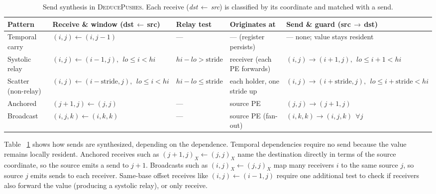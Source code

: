 \documentclass[sigplan, nonacm]{acmart}
\begin{document}
\begin{table}[t]
\centering
\caption{Send synthesis in \textsc{DeducePushes}. Each receive
(\emph{dst}\,$\leftarrow$\,\emph{src}) is classified by its coordinate
and matched with a send.} %
\label{tab:send-taxonomy}
\small
\renewcommand{\arraystretch}{1.35}
\begin{tabular}{@{}lllll@{}}
\toprule
\textbf{Pattern} & \textbf{Receive \& window (dst\,$\leftarrow$\,src)} &
\textbf{Relay test} & \textbf{Originates at} &
\textbf{Send \& guard (src\,$\rightarrow$\,dst)} \\
\midrule
Temporal carry & $(i,j)\leftarrow(i,j{-}1)$ & --- & --- (register persists) & --- none; value stays resident \\
Systolic relay & $(i,j)\leftarrow(i{-}1,j),\ \ \mathit{lo}\le i<\mathit{hi}$ & $\mathit{hi}{-}\mathit{lo}>\text{stride}$ & receiver (each PE forwards) & $(i,j)\rightarrow(i{+}1,j),\ \ \mathit{lo}\le i{+}1<\mathit{hi}$ \\
Scatter (non-relay) & $(i,j)\leftarrow(i{-}\text{stride},j),\ \ \mathit{lo}\le i<\mathit{hi}$ & $\mathit{hi}{-}\mathit{lo}\le\text{stride}$ & each holder, one stride up & $(i,j)\rightarrow(i{+}\text{stride},j),\ \ \mathit{lo}\le i{+}\text{stride}<\mathit{hi}$ \\
Anchored       & $(j{+}1,j)\leftarrow(j,j)$ & --- & source PE & $(j,j)\rightarrow(j{+}1,j)$ \\
Broadcast      & $(i,j,k)\leftarrow(i,k,k)$ & --- & source PE (fan-out) & $(i,k,k)\rightarrow(i,j,k)\ \ \forall j$ \\
\bottomrule
\end{tabular}
\end{table}


Table ~\ref{tab:send-taxonomy} shows how sends are synthesized, depending on the dependence.
Temporal dependencies require no send because the value remains locally resident.  Anchored receives such as $(j+1,j)_X \leftarrow (j,j)_X$ name the destination directly in terms of the source coordinate, so the source emits a send to $j+1$. Broadcasts such as $(i,j)_X \leftarrow (j,j)_X$  map many receivers $i$ to the same source $j$, so source $j$ emits sends to each receiver. Same-base offset receives like $(i,j)\leftarrow (i-1,j)$ require one additional test to check if receivers also forward the value (producing a systolic relay), or only receive.  
\end{document}

